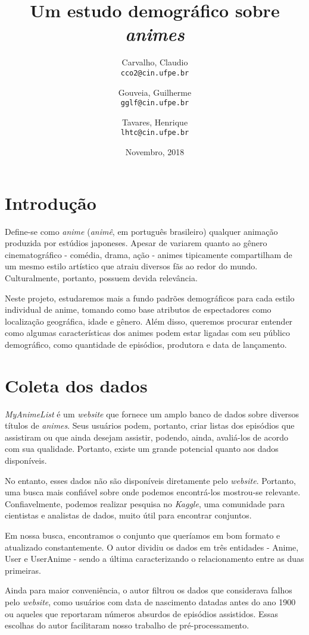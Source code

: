 \documentclass{article}
\title{Um estudo demográfico sobre \textit{animes}}
\author{
  Carvalho, Claudio\\
  \texttt{cco2@cin.ufpe.br}
  \and
  Gouveia, Guilherme\\
  \texttt{gglf@cin.ufpe.br}
  \and
  Tavares, Henrique\\
  \texttt{lhtc@cin.ufpe.br}
}
\date{Novembro, 2018}
\begin{document}
\maketitle

\section{Introdução}
\quad Define-se como \textit{anime}\cite{anime} (\textit{animê}, em português brasileiro) qualquer animação produzida por estúdios japoneses. Apesar de variarem quanto ao gênero cinematográfico - comédia, drama, ação - animes tipicamente compartilham de um mesmo estilo artístico que atraiu diversos fãs ao redor do mundo. Culturalmente, portanto, possuem devida relevância. \par
Neste projeto, estudaremos mais a fundo padrões demográficos para cada estilo individual de anime, tomando como base atributos de espectadores como localização geográfica, idade e gênero. Além disso, queremos procurar entender como algumas características dos animes podem estar ligadas com seu público demográfico, como quantidade de episódios, produtora e data de lançamento.

\section{Coleta dos dados}
\quad \textit{MyAnimeList} é um \textit{website} que fornece um amplo banco de dados sobre diversos títulos de \textit{animes}. Seus usuários podem, portanto, criar listas dos episódios que assistiram ou que ainda desejam assistir, podendo, ainda, avaliá-los de acordo com sua qualidade. Portanto, existe um grande potencial quanto aos dados disponíveis.\par
No entanto, esses dados não são disponíveis diretamente pelo \textit{website}. Portanto, uma busca mais confiável sobre onde podemos encontrá-los mostrou-se relevante. Confiavelmente, podemos realizar pesquisa no \textit{Kaggle}, uma comunidade para cientistas e analistas de dados, muito útil para encontrar conjuntos.\par
Em nossa busca, encontramos o conjunto que queríamos em bom formato e atualizado constantemente. O autor dividiu os dados em três entidades - Anime, User e UserAnime - sendo a última caracterizando o relacionamento entre as duas primeiras.\par
Ainda para maior conveniência, o autor filtrou os dados que considerava falhos pelo \textit{website}, como usuários com data de nascimento datadas antes do ano 1900 ou aqueles que reportaram números absurdos de episódios assistidos. Essas escolhas do autor facilitaram nosso trabalho de pré-processamento.
\end{document}

